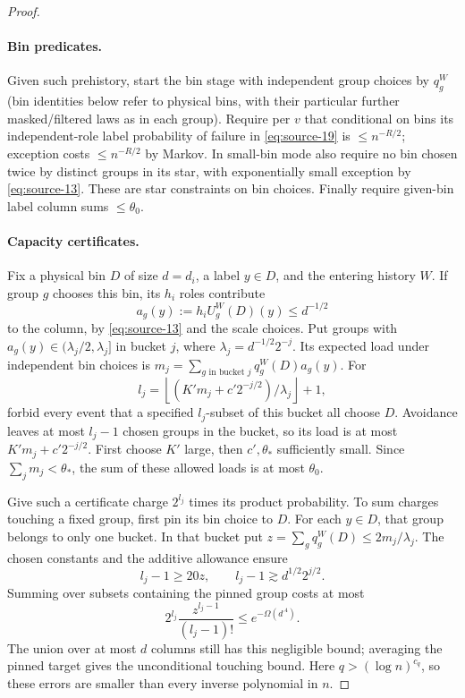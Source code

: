 \begin{proof}\leavevmode\par
\paragraph{Bin predicates.}
Given such prehistory, start the bin stage with independent group choices by \(q_g^W\) (bin identities below refer to physical bins, with their particular further masked/filtered laws as in each group). Require per \(v\) that conditional on bins its independent-role label probability of failure in \eqref{eq:source-19} is \(\le n^{-R/2}\); exception costs \(\le n^{-R/2}\) by Markov. In small-bin mode also require no bin chosen twice by distinct groups in its star, with exponentially small exception by \eqref{eq:source-13}. These are star constraints on bin choices. Finally require given-bin label column sums \(\le\theta_0\).

\paragraph{Capacity certificates.}
Fix a physical bin \(D\) of size \(d=d_i\), a label \(y\in D\), and the entering history \(W\). If group \(g\) chooses this bin, its \(h_i\) roles contribute
\[
 a_g(y):=h_iU_g^W(D)(y)\le d^{-1/2}
\]
to the column, by \eqref{eq:source-13} and the scale choices. Put groups with \(a_g(y)\in(\lambda_j/2,\lambda_j]\) in bucket \(j\), where \(\lambda_j=d^{-1/2}2^{-j}\). Its expected load under independent bin choices is
\(m_j=\sum_{g\text{ in bucket }j}q_g^W(D)a_g(y)\).
For
\[
 l_j=\left\lfloor(K'm_j+c'2^{-j/2})/\lambda_j\right\rfloor+1,
\]
forbid every event that a specified \(l_j\)-subset of this bucket all choose \(D\). Avoidance leaves at most \(l_j-1\) chosen groups in the bucket, so its load is at most \(K'm_j+c'2^{-j/2}\). First choose \(K'\) large, then \(c',\theta_*\) sufficiently small. Since \(\sum_jm_j<\theta_*\), the sum of these allowed loads is at most \(\theta_0\).

Give such a certificate charge \(2^{l_j}\) times its product probability. To sum charges touching a fixed group, first pin its bin choice to \(D\). For each \(y\in D\), that group belongs to only one bucket. In that bucket put \(z=\sum_gq_g^W(D)\le2m_j/\lambda_j\). The chosen constants and the additive allowance ensure
\[
 l_j-1\ge20z,\qquad l_j-1\gtrsim d^{1/2}2^{j/2}.
\]
Summing over subsets containing the pinned group costs at most
\[
 2^{l_j}\frac{z^{l_j-1}}{(l_j-1)!}
       \le e^{-\Omega(d^{.4})}.
\]
The union over at most \(d\) columns still has this negligible bound; averaging the pinned target gives the unconditional touching bound. Here \(q>(\log n)^{c_q}\), so these errors are smaller than every inverse polynomial in \(n\).


\end{proof}
